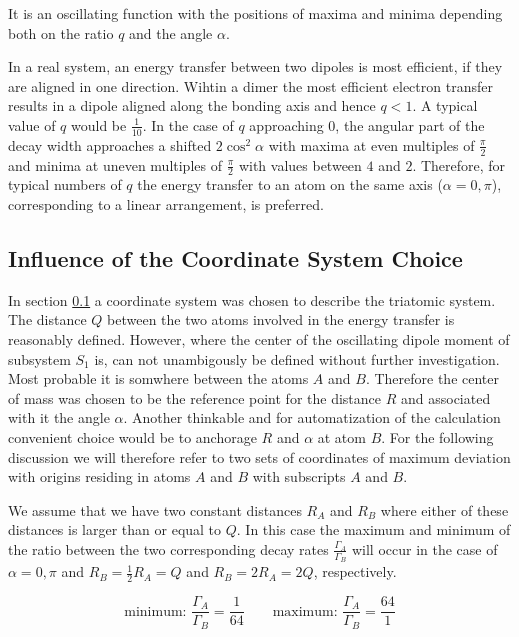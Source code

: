 It is an oscillating function with the positions of maxima and minima
depending both on the ratio $q$ and the angle $\alpha$.

In a real system, an energy transfer between
two dipoles is most efficient, if they are aligned in one direction.
Wihtin a dimer the most efficient electron transfer results in a
dipole aligned along the bonding axis and hence $q<1$. A typical
value of $q$ would be $\frac 1{10}$. In the 
case of $q$ approaching 0, the angular part of
the decay width
approaches a shifted $2\cos^2 \alpha$ with maxima at even multiples of $\frac \pi2$
and minima at uneven multiples of $\frac \pi2$ with values between
$4$ and $2$.
Therefore, for typical numbers of $q$ the energy transfer
to an atom on the same axis ($\alpha = 0,\pi$), corresponding
to a linear arrangement, is preferred.



\subsection{Influence of the Coordinate System Choice}
In section \ref{} a coordinate system was chosen to describe the
triatomic system. The distance $Q$ between the two atoms involved
in the energy transfer is reasonably defined. However, where the
center of the oscillating dipole moment of subsystem $S_1$ is, can
not unambigously be defined without further investigation. Most
probable it is somwhere between the atoms $A$ and $B$. Therefore
the center of mass was chosen to be the reference point for the
distance $R$ and associated with it the angle $\alpha$.
Another thinkable and for automatization of the calculation
convenient choice would be to anchorage $R$ and $\alpha$ at
atom $B$.
For the following discussion we will therefore refer to two sets
of coordinates of maximum deviation with origins residing in atoms
$A$ and $B$ with subscripts $A$ and $B$.

We assume that we have two constant distances $R_{A}$ and $R_B$
where either of these distances is larger than or equal to $Q$.
In this case the maximum and minimum of the ratio between the two
corresponding decay rates $\frac{\Gamma_{A}}{\Gamma_B}$ will occur
in the case of $\alpha = 0,\pi$ and $R_B = \frac 12 R_{A} = Q$
and $R_B = 2 R_{A} = 2Q$, respectively.

\begin{equation}
\text{minimum: } \frac{\Gamma_{A}}{\Gamma_B}= \frac{1}{64} \quad\quad
\text{maximum: } \frac{\Gamma_{A}}{\Gamma_B}= \frac{64}{1}
\end{equation}

